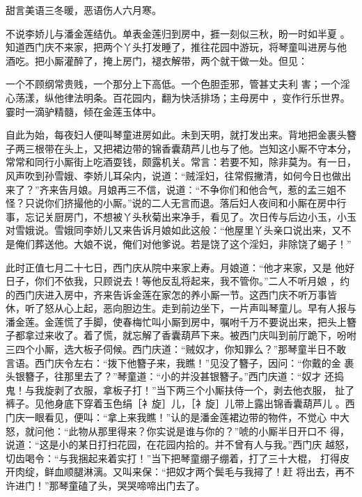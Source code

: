 甜言美语三冬暖，恶语伤人六月寒。

不说李娇儿与潘金莲结仇。单表金莲归到房中，捱一刻似三秋，盼一时如半夏
。知道西门庆不来家，把两个丫头打发睡了，推往花园中游玩，将琴童叫进房与他
酒吃。把小厮灌醉了，掩上房门，褪衣解带，两个就干做一处。但见：

一个不顾纲常贵贱，一个那分上下高低。一个色胆歪邪，管甚丈夫利
害；一个淫心荡漾，纵他律法明条。百花园内，翻为快活排场；主母房中
，变作行乐世界。霎时一滴驴精髓，倾在金莲玉体中。

自此为始，每夜妇人便叫琴童进房如此。未到天明，就打发出来。背地把金裹头簪
子两三根带在头上，又把裙边带的锦香囊葫芦儿也与了他。岂知这小厮不守本分，
常常和同行小厮街上吃酒耍钱，颇露机关。常言：若要不知，除非莫为。有一日，
风声吹到孙雪娥、李娇儿耳朵内，说道：“贼淫妇，往常假撇清，如何今日也做出
来了？”齐来告月娘。月娘再三不信，说道：“不争你们和他合气，惹的孟三姐不
怪？只说你们挤撮他的小厮。”说的二人无言而退。落后妇人夜间和小厮在房中行
事，忘记关厨房门，不想被丫头秋菊出来净手，看见了。次日传与后边小玉，小玉
对雪娥说。雪娥同李娇儿又来告诉月娘如此这般：“他屋里丫头亲口说出来，又不
是俺们葬送他。大娘不说，俺们对他爹说。若是饶了这个淫妇，非除饶了蝎子！”

此时正值七月二十七日，西门庆从院中来家上寿。月娘道：“他才来家，又是
他好日子，你们不依我，只顾说去！等他反乱将起来，我不管你。”二人不听月娘
，约的西门庆进入房中，齐来告诉金莲在家怎的养小厮一节。这西门庆不听万事皆
休，听了怒从心上起，恶向胆边生。走到前边坐下，一片声叫琴童儿。早有人报与
潘金莲。金莲慌了手脚，使春梅忙叫小厮到房中，嘱咐千万不要说出来，把头上簪
子都拿过来收了。着了慌，就忘解了香囊葫芦下来。被西门庆叫到前厅跪下，吩咐
三四个小厮，选大板子伺候。西门庆道：“贼奴才，你知罪么？”那琴童半日不敢
言语。西门庆令左右：“拨下他簪子来，我瞧！”见没了簪子，因问：“你戴的金
裹头银簪子，往那里去了？”琴童道：“小的并没甚银簪子。”西门庆道：“奴才
还捣鬼！与我旋剥了衣服，拿板子打！”当下两三个小厮扶侍一个，剥去他衣服，
扯了裤子。见他身底下穿着玉色绢［衤旋］儿，［衤旋］儿带上露出锦香囊葫芦儿
。西门庆一眼看见，便叫：“拿上来我瞧！”认的是潘金莲裙边带的物件，不觉心
中大怒，就问他：“此物从那里得来？你实说是谁与你的？”唬的小厮半日开口不
得，说道：“这是小的某日打扫花园，在花园内拾的。并不曾有人与我。”西门庆
越怒，切齿喝令：“与我捆起来着实打！”当下把琴童绷子绷着，打了三十大棍，
打得皮开肉绽，鲜血顺腿淋漓。又叫来保：“把奴才两个鬓毛与我撏了！赶
将出去，再不许进门！”那琴童磕了头，哭哭啼啼出门去了。


